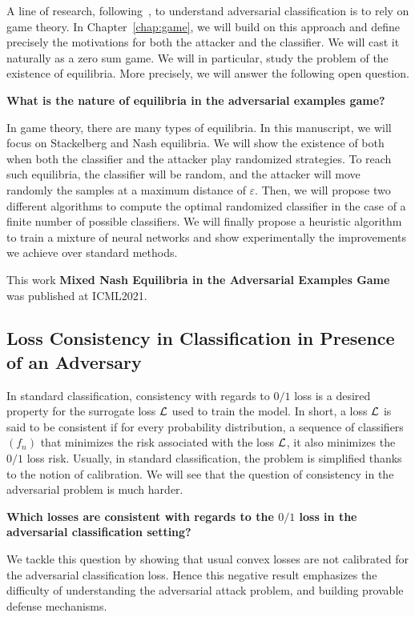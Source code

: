 A line of research, following~\cite{pinot2020randomization}, to understand adversarial classification is to rely on game theory. In Chapter~\ref{chap:game},  we will build on this approach and define precisely the motivations for both the attacker and the classifier. We will cast it naturally as a zero sum game. We will in particular, study the problem  of the existence of equilibria. More precisely, we will answer the following open question.
\medskip
\begin{tcolorbox}[title=Question 1]
\textbf{What is the nature of equilibria in the adversarial examples game?}
\end{tcolorbox}
\medskip

In game theory, there are many types of equilibria. In this manuscript, we will focus on Stackelberg and Nash equilibria. We will show the existence of both when both the classifier and the attacker play randomized strategies. To reach such equilibria, the classifier will be random, and the attacker will move randomly the samples at a maximum distance of $\varepsilon$. Then, we will propose two different algorithms to compute the optimal randomized classifier in the case of a finite number of possible classifiers. We will finally propose a heuristic algorithm to train a mixture of neural networks and show experimentally the improvements we achieve over standard methods.

This work \textbf{Mixed Nash Equilibria in the Adversarial Examples Game} was published at ICML2021.



\subsection{Loss Consistency in Classification in Presence of an Adversary}
In standard classification, consistency with regards to $0/1$ loss is a desired property for the surrogate loss $\mathcal{L}$ used to train the model. In short, a loss $\mathcal{L}$ is said to be consistent if for every probability distribution, a sequence of classifiers $(f_n)$ that minimizes the risk associated with the loss $\mathcal{L}$, it also minimizes the $0/1$ loss risk. Usually, in standard classification, the problem is simplified thanks to the notion of calibration. We will see that the question of consistency in the adversarial problem is much harder. 
\medskip
\begin{tcolorbox}[title=Question 2]
\textbf{Which losses are consistent with regards to the $0/1$ loss in the adversarial classification setting?}
\end{tcolorbox}
\medskip
We tackle this question by showing that usual convex losses are not calibrated for the adversarial classification loss. Hence this negative result emphasizes the difficulty of understanding the adversarial attack problem, and building provable defense mechanisms. 

